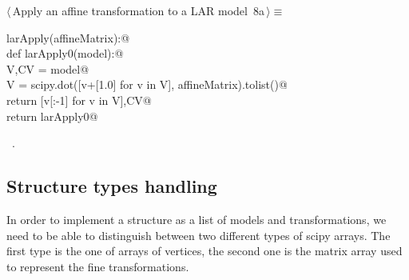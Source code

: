 \documentclass[11pt,oneside]{article}	%
\begin{document}
\begin{flushleft} \small \label{scrap17}
\protect{}$\langle\,$Apply an affine transformation to a LAR model\nobreak\ {\footnotesize 8a}$\,\rangle\equiv$
\vspace{-1ex}
\begin{list}{}{} \item
\mbox{}\verb@def larApply(affineMatrix):@\\
\mbox{}\verb@   def larApply0(model):@\\
\mbox{}\verb@      V,CV = model@\\
\mbox{}\verb@      V = scipy.dot([v+[1.0] for v in V], affineMatrix).tolist()@\\
\mbox{}\verb@      return [v[:-1] for v in V],CV@\\
\mbox{}\verb@   return larApply0@\\
\mbox{}\verb@@{\NWsep}
\end{list}
\vspace{-1ex}
\footnotesize\addtolength{\baselineskip}{-1ex}
\begin{list}{}{\setlength{\itemsep}{-\parsep}\setlength{\itemindent}{-\leftmargin}}
\item \NWtxtMacroRefIn\ .
\end{list}
\end{flushleft}


\subsection{Structure types handling}

In order to implement a structure as a list of models and transformations, we need to be able to distinguish between two different types of scipy arrays. The first type is the one of arrays of vertices, the second one is the matrix array used to represent the fine transformations.
\end{document}
